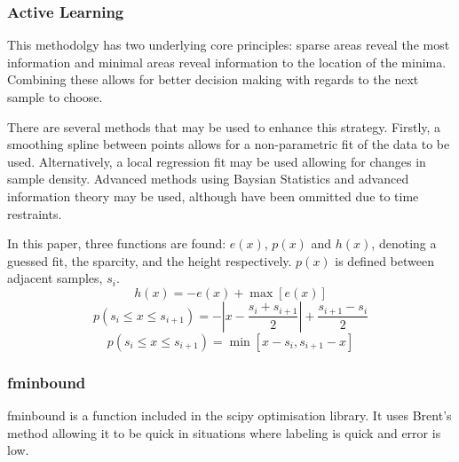 \subsubsection{Active Learning}
This methodolgy has two underlying core principles: sparse areas reveal the most information and minimal areas reveal information to the location of the minima. Combining these allows for better decision making with regards to the next sample to choose.

There are several methods that may be used to enhance this strategy. Firstly, a smoothing spline between points allows for a non-parametric fit of the data to be used. Alternatively, a local regression fit may be used allowing for changes in sample density. Advanced methods using Baysian Statistics and advanced information theory may be used, although have been ommitted due to time restraints.

In this paper, three functions are found: $e(x)$, $p(x)$ and $h(x)$, denoting a guessed fit, the sparcity, and the height respectively. $p(x)$ is defined between adjacent samples, $s_i$.
\begin{equation}
  {h(x)=-e(x)+\max[e(x)]}
\end{equation}
\begin{equation}
  p(s_i \le x \le s_{i+1})=-\left|x-\frac{s_i+s_{i+1}}{2}\right|+\frac{s_{i+1}-s_{i}}{2}
\end{equation}
\begin{equation}
  p(s_i \le x \le s_{i+1})=\min[x-s_i, s_{i+1}-x]
\end{equation}
\subsubsection{fminbound}
fminbound is a function included in the scipy optimisation library. It uses Brent's method allowing it to be quick in situations where labeling is quick and error is low.


